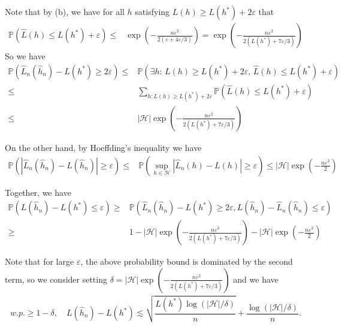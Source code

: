 \documentclass[11pt,a4paper]{ctexart}
\numberwithin{equation}{section}%
\begin{document}
Note that by (b), we have for all $ h $ satisfying $ L(h) \geq L(h^*)+2\varepsilon $ that
\begin{align*}
    \mathbb{P}\left( \hat{L}(h) \leq L(h^*)+\varepsilon \right) \leq & \exp\left( -\frac{n\varepsilon^2}{2( \varepsilon +4\varepsilon /3 )} \right) = \exp\left( -\frac{n\varepsilon^2}{2( L(h^*)+7\varepsilon /3 )} \right) 
\end{align*}
So we have
\begin{align*}
    \mathbb{P}\left( \hat{L}_n(\hat{h}_n) - L(h^*)\geq 2\varepsilon  \right) \leq & \mathbb{P}\left( \exists h:\, L(h) \geq L(h^*)+2\varepsilon,\,  \hat{L}(h) \leq L(h^*)+\varepsilon \right)   \\
    \leq & \sum_{h: L(h) \geq L(h^*)+2\varepsilon} \mathbb{P}\left( \hat{L}(h) \leq L(h^*)+\varepsilon \right)  \\
    \leq &\left\vert \mathcal{H} \right\vert  \exp\left( -\frac{n\varepsilon^2}{2( L(h^*)+7\varepsilon /3 )} \right) 
\end{align*}

On the other hand, by Hoeffding's inequality we have
\begin{align*}
    \mathbb{P}\left( \left\vert \hat{L}_n (\hat{h}_n) - L(\hat{h}_n) \right\vert \geq \varepsilon   \right) \leq & \mathbb{P}\left( \sup_{h\in\mathcal{H}} \left\vert \hat{L}_n (h) - L(h) \right\vert \geq \varepsilon  \right) \leq
    \left\vert \mathcal{H} \right\vert  \exp\left( -\frac{n\varepsilon^2}{2} \right)
\end{align*}

Together, we have
\begin{align*}
    \mathbb{P}\left( L(\hat{h}_n)-L(h^*)\leq \varepsilon  \right) \geq &\mathbb{P}\left( \hat{L}_n(\hat{h}_n) - L(h^*)\geq 2\varepsilon ,  L(\hat{h}_n)-\hat{L}_n (\hat{h}_n) \leq \varepsilon  \right)\\
    \geq & 1- \left\vert \mathcal{H} \right\vert  \exp\left( -\frac{n\varepsilon^2}{2( L(h^*)+7\varepsilon /3 )} \right) - \left\vert \mathcal{H} \right\vert  \exp\left( -\frac{n\varepsilon^2}{2} \right)
\end{align*}

Note that for large $ \varepsilon  $, the above probability bound is dominated by the second term, so we consider setting $ \delta = \left\vert \mathcal{H} \right\vert  \exp\left( -\frac{n\varepsilon^2}{2( L(h^*)+7\varepsilon /3 )} \right)  $ and we have
\begin{align*}
    w.p. \geq 1-\delta ,\quad L(\hat{h}_n)-L(h^*) \lesssim \sqrt{\dfrac{ L(h^*)\log (\left\vert \mathcal{H} \right\vert / \delta  ) }{ n } } + \dfrac{ \log (\left\vert \mathcal{H} \right\vert / \delta  ) }{ n } .
\end{align*}
\end{document}
